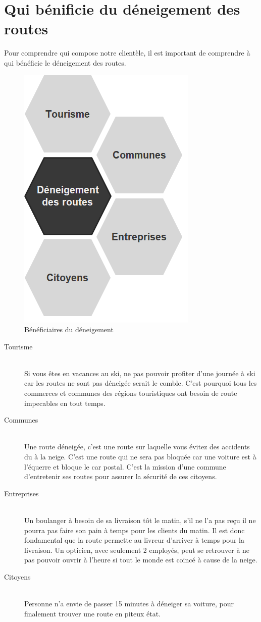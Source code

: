 \section{Qui bénificie du déneigement des routes}
Pour comprendre qui compose notre clientèle, il est important de comprendre à qui
bénéficie le déneigement des routes.

\begin{figure}[H]
    \centering
    \includegraphics[width=0.25\linewidth]{Images/business/beneficiaires.png}
    \caption[]{Bénéficiaires du déneigement}
    \label{fig:beneficiaires}
\end{figure}

\begin{description}
    \item[Tourisme] \hfill \\
    Si vous êtes en vacances au ski, ne pas pouvoir profiter d'une journée à ski car
    les routes ne sont pas déneigée serait le comble. C'est pourquoi tous les commerces
    et communes des régions touristiques ont besoin de route impecables en tout temps.
    \item[Communes] \hfill \\
    Une route déneigée, c'est une route sur laquelle vous évitez des accidents du à la neige.
    C'est une route qui ne sera pas bloquée car une voiture est à l'équerre et bloque le car postal.
    C'est la mission d'une commune d'entretenir ses routes pour assurer la sécurité de ces citoyens.
    \item[Entreprises] \hfill \\
    Un boulanger à besoin de sa livraison tôt le matin, s'il ne l'a pas reçu il ne pourra
    pas faire son pain à temps pour les clients du matin. Il est donc fondamental que la route
    permette au livreur d'arriver à temps pour la livraison.
    Un opticien, avec seulement 2 employés, peut se retrouver à ne pas pouvoir ouvrir à l'heure
    si tout le monde est coincé à cause de la neige.
    \item[Citoyens] \hfill \\    
    Personne n'a envie de passer 15 minutes à déneiger sa voiture, pour finalement trouver une
    route en piteux état.
\end{description}

